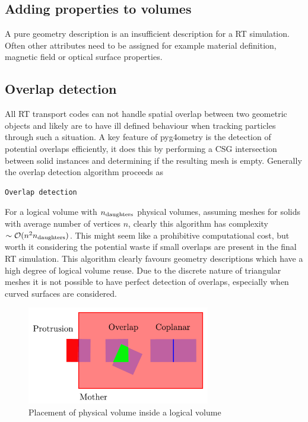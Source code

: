 \documentclass[final,5p,times,twocolumn]{elsarticle}
\begin{document}
\subsection{Adding properties to volumes}
A pure geometry description is an insufficient description for a RT simulation. Often other attributes need to be assigned for example material definition, magnetic field or  
optical surface properties.  

\subsection{Overlap detection}
All RT transport codes can not handle spatial overlap between two geometric objects and likely are to have ill defined behaviour when tracking particles  
through such a situation.  A key feature of pyg4ometry is the detection of potential overlaps efficiently, it does this by performing a CSG intersection between solid instances 
and determining if the resulting mesh is empty. Generally the overlap detection algorithm proceeds as 

{\small 
\begin{verbatim}
Overlap detection
\end{verbatim}
} 

For a logical volume with $n_{\rm daughters}$ physical volumes, assuming meshes for solids with average number of vertices $n$, clearly this algorithm has complexity $\sim \mathcal{O}(n^2 n_{\rm daughters})$. This might seem like a prohibitive computational cost, but worth it considering the potential waste if small overlaps are present in the final 
RT simulation. This algorithm clearly favours geometry descriptions which have a high degree of logical volume reuse. Due to the discrete nature of triangular meshes it is not possible to have perfect detection of overlaps, especially when curved surfaces are considered. 
 \begin{figure}[htbp]
\begin{center}
\includegraphics[width=8cm]{./diagrams/overlap.pdf}
\caption{Placement of physical volume inside a logical volume}
\label{fig:overlap}
\end{center}
\end{figure} 
\end{document}
